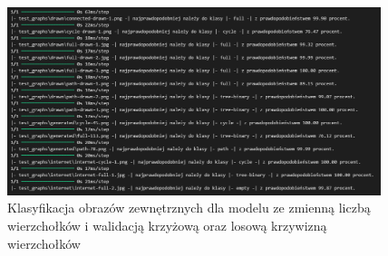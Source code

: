 \begin{figure}[ht]
	\centering
	\includegraphics[height=5.5cm]{resources/tests/images/v3/multiple_edges_crossvalid_txt.png}
	\caption{Klasyfikacja obrazów zewnętrznych dla modelu ze zmienną liczbą wierzchołków i walidacją krzyżową oraz losową krzywizną wierzchołków}
	\label{Fig:tests-csvar-2}
\end{figure}
\FloatBarrier